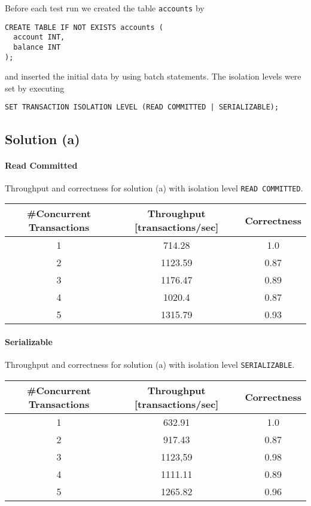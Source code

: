 \documentclass[11pt]{scrartcl}
\begin{document}
Before each test run we created the table \texttt{accounts} by
\begin{lstlisting}[style=dbtsql]
CREATE TABLE IF NOT EXISTS accounts (
  account INT,
  balance INT
);
\end{lstlisting}

and inserted the initial data by using batch statements.
The isolation levels were set by executing
\begin{lstlisting}[style=dbtsql]
SET TRANSACTION ISOLATION LEVEL (READ COMMITTED | SERIALIZABLE);
\end{lstlisting}


\subsection*{Solution (a)}

\paragraph{Read Committed}

Throughput and correctness for solution (a) with isolation level \lstinline[style=dbtsql]{READ COMMITTED}.

\begin{table}[H]
  \centering
  \begin{tabular}{c|c|c}
    \#Concurrent Transactions & Throughput [transactions/sec] & Correctness
      \tabularnewline
    \hline
    1 & 714.28 & 1.0 \tabularnewline
    2 & 1123.59 & 0.87 \tabularnewline
    3 & 1176.47 & 0.89 \tabularnewline
    4 & 1020.4 & 0.87 \tabularnewline
    5 & 1315.79 & 0.93 \tabularnewline
  \end{tabular}
\end{table}

\paragraph{Serializable}

Throughput and correctness for solution (a) with isolation level \lstinline[style=dbtsql]{SERIALIZABLE}.

\begin{table}[H]
  \centering
  \begin{tabular}{c|c|c}
    \#Concurrent Transactions & Throughput [transactions/sec] & Correctness
      \tabularnewline
    \hline
    1 & 632.91 & 1.0 \tabularnewline
    2 & 917.43 & 0.87 \tabularnewline
    3 & 1123,59 & 0.98 \tabularnewline
    4 & 1111.11 & 0.89 \tabularnewline
    5 & 1265.82 & 0.96 \tabularnewline
  \end{tabular}
\end{table}
\end{document}
